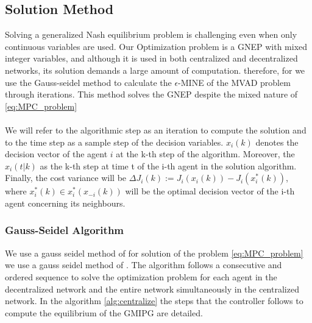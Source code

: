 

\subsection{Solution Method}

Solving a generalized Nash equilibrium problem is challenging even when only continuous variables are used. Our Optimization problem is a GNEP with mixed integer variables, and although it is used in both centralized and decentralized networks, its solution demands a large amount of computation. therefore, for \cite{18t_article} we use the Gauss-seidel method to calculate the $\epsilon$-MINE of the MVAD problem through iterations. This method solves the GNEP despite the mixed nature of \ref{eq:MPC_problem}
\\
\\
We will refer to the algorithmic step as an iteration to compute the solution and to the time step as a sample step of the decision variables. $x_i(k)$ denotes the decision vector of the agent $i$ at the k-th step of the algorithm. Moreover, the $x_i(t|k)$ as the k-th step at time t of the i-th agent in the solution algorithm. Finally, the cost variance will be $\Delta J_i(k)  := J_i(x_i(k)) - J_i(x_i^*(k))$, where $x^*_i(k) \in x^*_i(x_{-i}(k))$ will be the optimal decision vector of the i-th agent concerning its neighbours.


\subsubsection{Gauss-Seidel Algorithm}

We use a gauss seidel method of \cite{multivehicle} for solution of the problem \ref{eq:MPC_problem} we use a gauss seidel method of \cite{}. The algorithm follows a consecutive and ordered sequence to solve the optimization problem for each agent in the decentralized network and the entire network simultaneously in the centralized network. In the algorithm \ref{alg:centralize} the steps that the controller follows to compute the equilibrium of the GMIPG are detailed.






